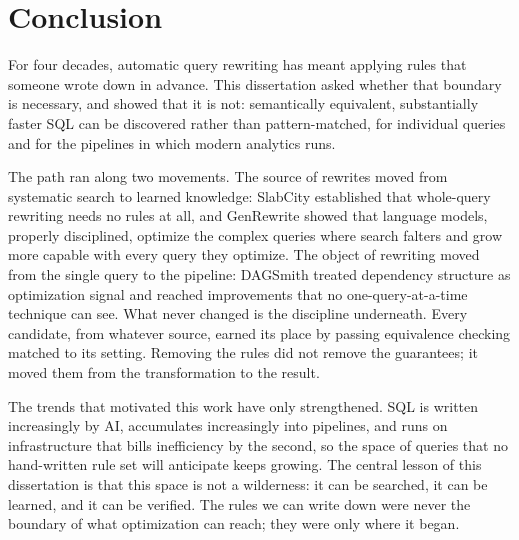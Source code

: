 \chapter{Conclusion}
\label{chap:conclusion}

For four decades, automatic query rewriting has meant applying rules
that someone wrote down in advance. This dissertation asked whether
that boundary is necessary, and showed that it is not: semantically
equivalent, substantially faster SQL can be discovered rather than
pattern-matched, for individual queries and for the pipelines in
which modern analytics runs.

The path ran along two movements. The source of rewrites moved from
systematic search to learned knowledge: SlabCity established that
whole-query rewriting needs no rules at all, and GenRewrite showed
that language models, properly disciplined, optimize the complex
queries where search falters and grow more capable with every query
they optimize. The object of rewriting moved from the single query
to the pipeline: DAGSmith treated dependency structure as
optimization signal and reached improvements that no
one-query-at-a-time technique can see. What never changed is the
discipline underneath. Every candidate, from whatever source, earned
its place by passing equivalence checking matched to its setting.
Removing the rules did not remove the guarantees; it moved them from
the transformation to the result.

The trends that motivated this work have only strengthened. SQL is
written increasingly by AI, accumulates increasingly into pipelines,
and runs on infrastructure that bills inefficiency by the second,
so the space of queries that no hand-written rule set will
anticipate keeps growing. The central lesson of this dissertation is
that this space is not a wilderness: it can be searched, it can be
learned, and it can be verified. The rules we can write down were
never the boundary of what optimization can reach; they were only
where it began.